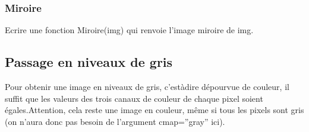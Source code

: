 \documentclass[letterpaper,10pt,english]{jupyterBook}
\begin{document}
\subsubsection{Miroire}
\label{\detokenize{notebooks/images/TRAITEMENT-DES-IMAGES:miroire}}
\sphinxAtStartPar
Ecrire une fonction Miroire(img) qui renvoie l’image miroire de img.
\begin{sphinxVerbatimInput}

\begin{sphinxVerbatim}[commandchars=\\\{\}]
\end{sphinxVerbatim}
\end{sphinxVerbatimInput}
\begin{sphinxVerbatimInput}

\begin{sphinxVerbatim}[commandchars=\\\{\}]
 
     \PYG{p}{[}\PYG{p}{[}\PYG{p}{[}\PYG{p}{]}    \PYG{p}{]}    \PYG{p}{]}
\end{sphinxVerbatim}
\end{sphinxVerbatimInput}
\begin{sphinxVerbatimInput}

\begin{sphinxVerbatim}[commandchars=\\\{\}]
\end{sphinxVerbatim}
\end{sphinxVerbatimInput}
\begin{sphinxVerbatimOutput}

\noindent{}
\end{sphinxVerbatimOutput}


\subsection{Passage en niveaux de gris}
\label{\detokenize{notebooks/images/TRAITEMENT-DES-IMAGES:passage-en-niveaux-de-gris}}
\sphinxAtStartPar
Pour obtenir une image en niveaux de gris, c’est\sphinxhyphen{}à\sphinxhyphen{}dire dépourvue de couleur, il suffit que les valeurs des trois canaux de couleur de chaque pixel soient égales.Attention, cela reste une image en couleur, même si tous les pixels sont gris (on n’aura donc pas besoin de l’argument cmap=”gray” ici).
\end{document}
